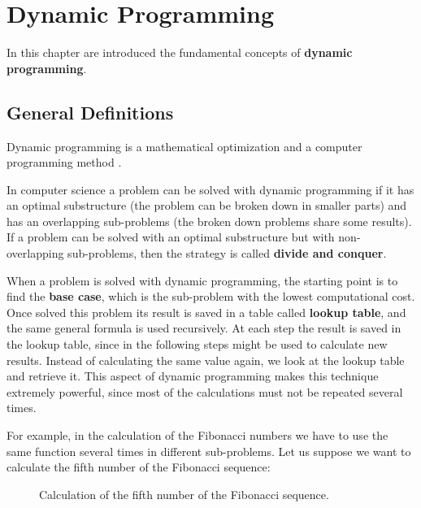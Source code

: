 \chapter{Dynamic Programming}
\label{chp:dynamicprogramming}
In this chapter are introduced the fundamental concepts of \textbf{dynamic programming}.
 
\section{General Definitions}
Dynamic programming is a mathematical optimization and a computer programming method \cite{wikidynamicprogramming}.

In computer science a problem can be solved with dynamic programming if it has an optimal substructure (the problem can be broken down in smaller parts) and has an overlapping sub-problems (the broken down problems share some results). If a problem can be solved with an optimal substructure but with non-overlapping sub-problems, then the strategy is called \textbf{divide and conquer}.

When a problem is solved with dynamic programming, the starting point is to find the \textbf{base case}, which is the sub-problem with the lowest computational cost. Once solved this problem its result is saved in a table called \textbf{lookup table}, and the same general formula is used recursively. At each step the result is saved in the lookup table, since in the following steps might be used to calculate new results. Instead of calculating the same value again, we look at the lookup table and retrieve it. This aspect of dynamic programming makes this technique extremely powerful, since most of the calculations must not be repeated several times.

For example, in the calculation of the Fibonacci numbers we have to use the same function several times in different sub-problems. Let us suppose we want to calculate the fifth number of the Fibonacci sequence:

\begin{figure}[H]
\centering
{}
\caption[Calculation of the fifth number of the Fibonacci sequence.]{Calculation of the fifth number of the Fibonacci sequence.}
\end{figure}

